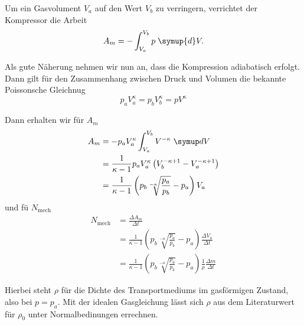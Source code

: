Um ein Gasvolument $V_a$ auf den Wert $V_b$ zu verringern, verrichtet der Kompressor die Arbeit
\begin{equation}
	A_m = 
	-\int_{V_a}^{V_b} p \; \symup{d}V.
	\label{eqn:arbeit-kompresion}
\end{equation}

Als gute N\"aherung nehmen wir nun an, dass die Kompression adiabatisch erfolgt. Dann gilt 
f\"ur den Zusammenhang zwischen Druck und Volumen die bekannte Poissonsche Gleichnug
\begin{equation}
	p_a V_a^\kappa = p_b V_b^\kappa = p V^\kappa
	\label{eqn:poissonsche_Gleichung}
\end{equation}

Dann erhalten wir f\"ur $A_m$
\begin{align}
	A_m 
	&= -p_a V_a^\kappa \int_{V_a}^{V_b} V^{-\kappa} \; \symup dV
	\\
	&= \frac{1}{\kappa - 1} p_a V_a^\kappa \left(V_b^{-\kappa+1} - V_a^{-\kappa +1} \right)
	\\
	&= \frac{1}{\kappa - 1} \left( p_b \sqrt[-\kappa]{\frac{p_a}{p_b}} - p_a \right) V_a
	\label{eqn:a_m}
\end{align}
und f\"u $N_\text{mech}$
\begin{align}
	N_\text{mech}
	&= \frac{\Delta A_m}{\Delta t}
	\\
	&= \frac{1}{\kappa - 1}  \left( p_b \sqrt[-\kappa]{\frac{p_a}{p_b}} - p_a \right) 
	\frac{\Delta V_a}{\Delta t}
	\\
	&=  \frac{1}{\kappa - 1}  \left( p_b \sqrt[-\kappa]{\frac{p_a}{p_b}} - p_a \right)
	\frac{1}{\rho} \frac{\Delta m}{\Delta t}
	\label{eqn:kompressorleistung}
\end{align}

Hierbei steht $\rho$ f\"ur die Dichte des Transportmediums im gasf\"ormigen Zustand, also 
bei $p = p_a$. Mit der idealen Gasgleichung l\"asst sich $\rho$ aus dem Literaturwert f\"ur
$\rho_0$ unter Normalbedinungen errechnen.
